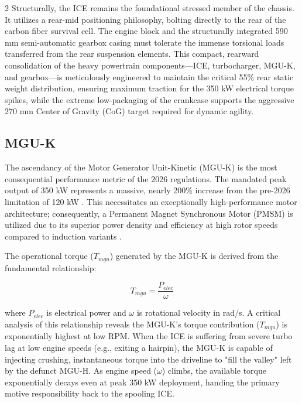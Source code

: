 \begin{multicols}{2}
Structurally, the ICE remains the foundational stressed member of the chassis. It utilizes a rear-mid positioning philosophy, bolting directly to the rear of the carbon fiber survival cell. The engine block and the structurally integrated 590 mm semi-automatic gearbox casing must tolerate the immense torsional loads transferred from the rear suspension elements. This compact, rearward consolidation of the heavy powertrain components—ICE, turbocharger, MGU-K, and gearbox—is meticulously engineered to maintain the critical 55\% rear static weight distribution, ensuring maximum traction for the 350 kW electrical torque spikes, while the extreme low-packaging of the crankcase supports the aggressive 270 mm Center of Gravity (CoG) target required for dynamic agility.

\subsection{MGU-K}

The ascendancy of the Motor Generator Unit-Kinetic (MGU-K) is the most consequential performance metric of the 2026 regulations. The mandated peak output of 350 kW represents a massive, nearly 200\% increase from the pre-2026 limitation of 120 kW \cite{FIA_2026_PU_Regulations}. This necessitates an exceptionally high-performance motor architecture; consequently, a Permanent Magnet Synchronous Motor (PMSM) is utilized due to its superior power density and efficiency at high rotor speeds compared to induction variants \cite{pmsm_control_lit}.

The operational torque ($T_{mgu}$) generated by the MGU-K is derived from the fundamental relationship:

\begin{equation} \label{eq:torque}
T_{mgu} = \frac{P_{elec}}{\omega}
\end{equation}

where $P_{elec}$ is electrical power and $\omega$ is rotational velocity in rad/s. A critical analysis of this relationship reveals the MGU-K's torque contribution ($T_{mgu}$) is exponentially highest at low RPM. When the ICE is suffering from severe turbo lag at low engine speeds (e.g., exiting a hairpin), the MGU-K is capable of injecting crushing, instantaneous torque into the driveline to "fill the valley" left by the defunct MGU-H. As engine speed ($\omega$) climbs, the available torque exponentially decays even at peak 350 kW deployment, handing the primary motive responsibility back to the spooling ICE. 


\end{multicols}
